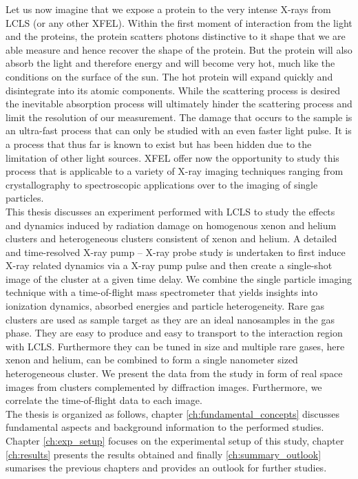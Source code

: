 Let us now imagine that we expose a protein to the very intense X-rays from LCLS (or any other XFEL). Within the first moment of interaction from the light and the proteins, the protein scatters photons distinctive to it shape that we are able measure and hence recover the shape of the protein. But the protein will also absorb the light and therefore energy and will become very hot, much like the conditions on the surface of the sun. The hot protein will expand quickly and disintegrate into its atomic components. While the scattering process is desired the inevitable absorption process will ultimately hinder the scattering process and limit the resolution of our measurement. The damage that occurs to the sample is an ultra-fast process that can only be studied with an even faster light pulse. It is a process that thus far is known to exist but has been hidden due to the limitation of other light sources. XFEL offer now the opportunity to study this process that is applicable to a variety of X-ray imaging techniques ranging from crystallography to spectroscopic applications over to the imaging of single particles.\\
This thesis discusses an experiment performed with LCLS to study the effects and dynamics induced by radiation damage on homogenous xenon and helium clusters and heterogeneous clusters consistent of xenon and helium. A detailed and time-resolved X-ray pump -- X-ray probe study is undertaken to first induce X-ray related dynamics via a X-ray pump pulse and then create a single-shot image of the cluster at a given time delay. We combine the single particle imaging technique with a time-of-flight mass spectrometer that yields insights into ionization dynamics, absorbed energies and particle heterogeneity. Rare gas clusters are used as sample target as they are an ideal nanosamples in the gas phase. They are easy to produce and easy to transport to the interaction region with LCLS. Furthermore they can be tuned in size and multiple rare gases, here xenon and helium, can be combined to form a single nanometer sized heterogeneous cluster. We present the data from the study in form of real space images from clusters complemented by diffraction images. Furthermore, we correlate the time-of-flight data to each image.\\
The thesis is organized as follows, chapter \ref{ch:fundamental_concepts} discusses fundamental aspects and background information to the performed studies. Chapter \ref{ch:exp_setup} focuses on the experimental setup of this study, chapter \ref{ch:results} presents the results obtained and finally \ref{ch:summary_outlook} sumarises the previous chapters and provides an outlook for further studies.